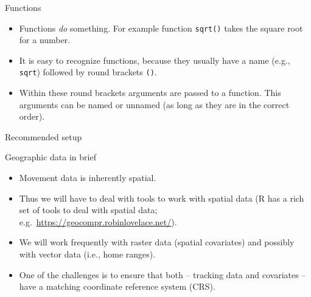 \documentclass[ignorenonframetext,,t]{beamer}
\providecommand{\tightlist}{%
\setlength{\itemsep}{0pt}\setlength{\parskip}{0pt}}
\providecommand{\tightlist}{%
\setlength{\itemsep}{0pt}\setlength{\parskip}{0pt}}
\renewcommand{\tightlist}{\setlength{\itemsep}{1.4ex}\setlength{\parskip}{0pt}}
\begin{document}
\begin{frame}[fragile]
\begin{block}{Functions}
\protect\hypertarget{functions}{}
\begin{itemize}
\tightlist
\item
  Functions \emph{do} something. For example function \texttt{sqrt()}
  takes the square root for a number.
\item
  It is easy to recognize functions, because they usually have a name
  (e.g., \texttt{sqrt}) followed by round brackets \texttt{()}.
\item
  Within these round brackets arguments are passed to a function. This
  arguments can be named or unnamed (as long as they are in the correct
  order).
\end{itemize}
\end{block}
\end{frame}

\begin{frame}{Recommended setup}
\protect\hypertarget{recommended-setup}{}
\end{frame}

\begin{frame}{Geographic data in brief}
\protect\hypertarget{geographic-data-in-brief}{}
\begin{itemize}
\item
  Movement data is inherently spatial.
\item
  Thus we will have to deal with tools to work with spatial data (R has
  a rich set of tools to deal with spatial data;
  e.g.~\url{https://geocompr.robinlovelace.net/}).
\item
  We will work frequently with raster data (spatial covariates) and
  possibly with vector data (i.e., home ranges).
\item
  One of the challenges is to ensure that both -- tracking data and
  covariates -- have a matching coordinate reference system (CRS).
\end{itemize}
\end{frame}
\end{document}
